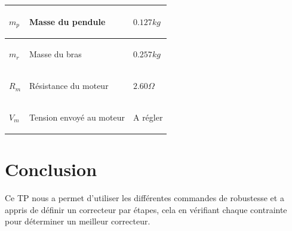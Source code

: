 \documentclass[12pt, a4paper, openany]{report}
\begin{document}
\begin{center}
\begin{tabular}{|R{2cm}|C{8cm}|L{2.5cm}|}
\hline  \begin{center} $m_{p}$\end{center}  &  \begin{center} Masse du pendule \end{center}  & \begin{center}$0.127 kg$ \end{center}\\
\hline  \begin{center} $m_{r}$\end{center}  &  \begin{center} Masse du bras \end{center}  & \begin{center}$0.257 kg$ \end{center}\\
\hline  \begin{center} $R_{m}$\end{center}  &  \begin{center} Résistance du moteur \end{center}  & \begin{center}$2.60 \Omega$ \end{center}\\
\hline  \begin{center} $V_{m}$\end{center}  &  \begin{center} Tension envoyé au moteur \end{center}  & \begin{center} A régler \end{center}\\
\hline 
\end{tabular}
 \end{center}
 
 
 


\chapter*{Conclusion}

Ce TP nous a permet d'utiliser les différentes commandes de robustesse et a appris de définir un correcteur par étapes, cela en vérifiant chaque contrainte pour déterminer un meilleur correcteur.\\










 







%
%
\end{document}
